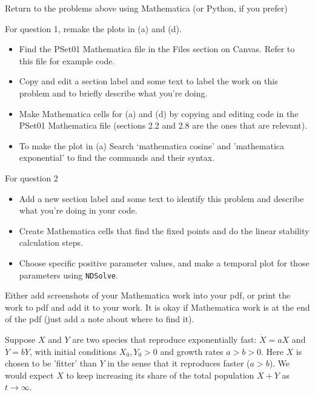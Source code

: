 \documentclass[12pt,letterpaper]{exam}
\begin{document}
\begin{questions}
\question Return to the problems above using Mathematica (or Python, if you prefer)
\begin{parts}
\item For question 1, remake the plots in (a) and (d).
\begin{itemize}
\itemsep-0.1em
    \item Find the PSet01 Mathematica file in the Files section on Canvas.  Refer to this file for example code.
    \item Copy and edit a section label and some text to label the work on this problem and to briefly describe what you're doing.
    \item Make Mathematica cells for (a) and (d) by copying and editing code in the PSet01 Mathematica file (sections 2.2 and 2.8 are the ones that are relevant).
    \item To make the plot in (a) Search `mathematica cosine' and 'mathematica exponential' to find the commands and their syntax.
\end{itemize}   
\item For question 2
\begin{itemize}
\item Add a new section label and some text to identify this problem and describe what you're doing in your code.
\item Create Mathematica cells that find the fixed points and do the linear stability calculation steps.
\item Choose specific positive parameter values, and make a temporal plot for those parameters using \texttt{NDSolve}.
\end{itemize}
\end{parts}
Either add screenshots of your Mathematica work into your pdf, or print the work to pdf and add it to your work.  It is okay if Mathematica work is at the end of the pdf (just add a note about where to find it).

\question %

Suppose $X$ and $Y$ are two species that reproduce exponentially fast: $\dot X = aX$ and $\dot Y = bY$, with initial conditions $X_0, Y_0 > 0$ and growth rates $a > b> 0$.  Here $X$ is chosen to be 'fitter' than $Y$ in the sense that it reproduces faster ($a>b$).  We would expect $X$ to keep increasing its share of the total population $X+Y$ as $t\rightarrow \infty$.  


\end{questions}
\end{document}
